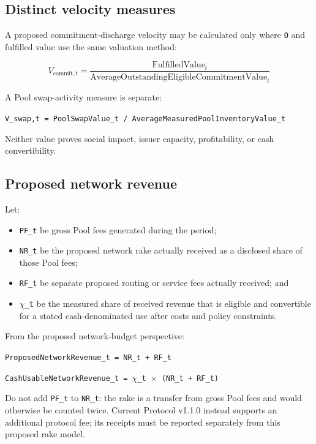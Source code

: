 \documentclass[11pt]{article}
\begin{document}
\subsection*{Distinct velocity measures}

A proposed commitment-discharge velocity may be calculated only where \texttt{O} and fulfilled value use the same valuation method:

\[
V_{\mathrm{commit},t} = \frac{\mathrm{FulfilledValue}_t}{\mathrm{AverageOutstandingEligibleCommitmentValue}_t}
\]

A Pool swap-activity measure is separate:

\texttt{V\_swap,t = PoolSwapValue\_t / AverageMeasuredPoolInventoryValue\_t}

Neither value proves social impact, issuer capacity, profitability, or cash convertibility.

\subsection*{Proposed network revenue}

Let:

\begin{itemize}[leftmargin=*]
\item \texttt{PF\_t} be gross Pool fees generated during the period;
\item \texttt{NR\_t} be the proposed network rake actually received as a disclosed share of those Pool fees;
\item \texttt{RF\_t} be separate proposed routing or service fees actually received; and
\item \texttt{$\chi$\_t} be the measured share of received revenue that is eligible and convertible for a stated cash-denominated use after costs and policy constraints.
\end{itemize}
From the proposed network-budget perspective:

\texttt{ProposedNetworkRevenue\_t = NR\_t + RF\_t}

\texttt{CashUsableNetworkRevenue\_t = $\chi$\_t $\times$ (NR\_t + RF\_t)}

Do not add \texttt{PF\_t} to \texttt{NR\_t}: the rake is a transfer from gross Pool fees and would otherwise be counted twice. Current Protocol v1.1.0 instead supports an additional protocol fee; its receipts must be reported separately from this proposed rake model.
\end{document}
